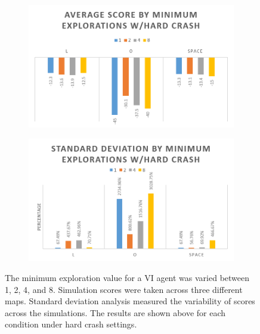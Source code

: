 \documentclass[12pt, letter]{article}
\begin{document}
\begin{figure}[h] 
    \centering
    \begin{subfigure}[b]{0.48\textwidth}
        \includegraphics[width=1\textwidth]{img/hard_AvgScore}
    \end{subfigure}
    \begin{subfigure}[b]{0.48\textwidth}
        \includegraphics[width=1\textwidth]{img/hard_StDev}
    \end{subfigure}
    \caption{The minimum exploration value for a VI agent was varied between 1, 2, 4, and 8.  Simulation scores were taken across three different maps. Standard deviation analysis measured the variability of scores across the simulations. The results are shown above for each condition under hard crash settings.}
    \label{fig:hardAvgScoreStDev}
\end{figure}
\end{document}
